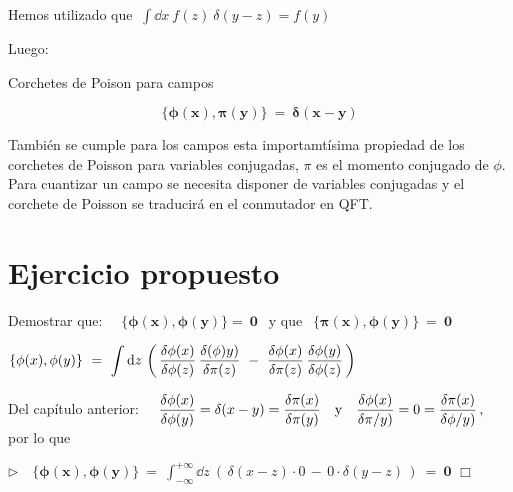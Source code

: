 Hemos utilizado que $\ \displaystyle \int \dd x \ f(z)\ \delta(y-z) = f(y)$

Luego:

\vspace{5mm}
\begin{myblock}{Corchetes de Poison para campos}
\begin{large}
\begin{equation}
\label{T38CPcampo}
\boldsymbol{
 \{\phi(x),\pi(y)\} \ = \ \delta(x-y)
}	
\end{equation}
\end{large}
\end{myblock}

También se cumple para los campos esta importamtísima propiedad de los corchetes de Poisson para variables conjugadas, $\pi$ es el momento conjugado de $\phi$. \textcolor{gris}{Para cuantizar un campo se necesita disponer de variables conjugadas y el corchete de Poisson se traducirá en el conmutador en QFT. }


\vspace{5mm}
\section{Ejercicio propuesto}
\vspace{5mm}
\begin{ejercicio}
\vspace{3mm}
Demostrar que: $\quad \boldsymbol{ \{\phi(x),\phi(y)\} = \ 0 } \ \ \text{ y que }	\ \  \boldsymbol{ \{\pi(x),\phi(y)\} \ = \ 0 }$
\vspace{3mm}
\end{ejercicio}
\vspace{5mm}

\color{MidnightBlue}

$\displaystyle \{\phi(x),\phi(y) \} \ = \ \int \dd z \, \left( \, \fdv{\phi(x)}{\phi(z)} \, \fdv{(\phi)y)}{\pi(z)} \ - \ \fdv{\phi(x)}{\pi(z)}\, \fdv{\phi(y)}{\phi(z)} \, \right)$


Del capítulo anterior: $ \quad \displaystyle \fdv{\phi(x)}{\phi(y)}=\delta(x-y)=\fdv{\pi(x)}{\pi(y)}  \ \ \text{ y } \ \  \fdv{\phi(x)}{\pi/y)}=0=\fdv{\pi(x)}{\phi/y)}\, , \ $ por lo que

$\triangleright \quad  \displaystyle \boldsymbol{ \{\phi(x),\phi(y)\} \ }= \ \int_{-\infty}^{+\infty} \dd z \ \left ( \,  \delta(x-z) \cdot 0 \, - \, 0 \cdot \delta(y-z) \, \right) \ = \ \boldsymbol{0}$ \hspace{6cm} $\Box$



